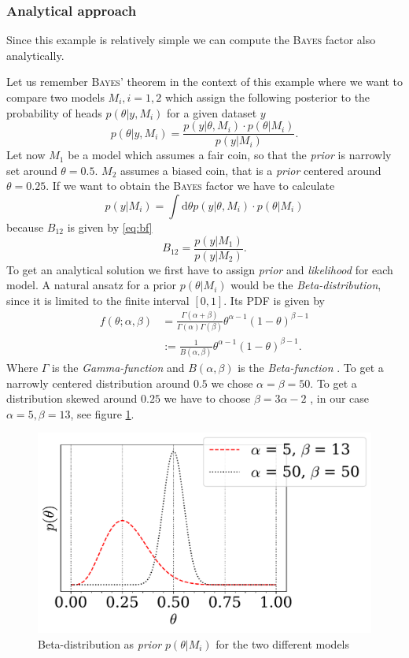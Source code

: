 \documentclass[%
 reprint,
 amsmath,amssymb,
 aps,
]{revtex4-1}
\begin{document}
\subsubsection{\textbf{Analytical approach}}
\noindent Since this example is relatively simple we can compute the \textsc{Bayes} factor also analytically.

Let us remember \textsc{Bayes'} theorem in the context of this example where we want to compare two models $M_i,i=1,2$ which assign the following posterior to the probability of heads $p(\theta|y,M_i)$ for a given dataset $y$
$$p(\theta|y,M_i)=\frac{p(y|\theta,M_i)\cdot p(\theta|M_i)}{p(y|M_i)}.$$
Let now $M_1$ be a model which assumes a fair coin, so that the \emph{prior} is narrowly set around $\theta=0.5$. $M_2$ assumes a biased coin, that is a \emph{prior} centered around $\theta =0.25$. If we want to obtain the \textsc{Bayes} factor we have to calculate $$p(y|M_i)=\int \text{d}\theta p(y|\theta,M_i)\cdot p(\theta|M_i) $$
because $B_{12}$ is given by \eqref{eq:bf} $$B_{12}=\frac{p(y|M_1)}{p(y|M_2)}.$$
To get an analytical solution we first have to assign \emph{prior} and \emph{likelihood} for each model. A natural ansatz for a prior $p(\theta|M_i)$ would be the \emph{Beta-distribution}, since it is limited to the finite interval $[0,1]$. Its PDF is given by \cite{wiki} \begin{align*}f(\theta;\alpha,\beta)&=\frac{\Gamma(\alpha+\beta)}{\Gamma(\alpha)\Gamma(\beta)}\theta^{\alpha-1}(1-\theta)^{\beta-1}\\&:=\frac{1}{B(\alpha,\beta)}\theta^{\alpha-1}(1-\theta)^{\beta-1}.
\end{align*}
Where $\Gamma$ is the \emph{Gamma-function} \cite{gamma_function} and $B(\alpha,\beta)$ is the \emph{Beta-function} \cite{beta_function}.
To get a narrowly centered distribution around $0.5$ we chose $\alpha=\beta=50$. To get a distribution skewed around $0.25$ we have to choose $\beta=3\alpha-2$ \cite{wiki}, in our case $\alpha=5,\beta=13$, see figure \ref{fig:beta_dist}.
\begin{figure}[htbp]
	\centering
	\includegraphics[width=\linewidth]{beta_dist}
	\caption{Beta-distribution as \emph{prior} $p(\theta|M_i)$ for the two different models}
	\label{fig:beta_dist}
\end{figure}
\end{document}
